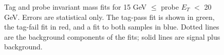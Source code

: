 \documentclass[dissertation.tex]{subfiles}
\begin{document}
\begin{figure}
	\centering
	\hspace{1cm}
	\caption{Tag and probe invariant mass fits for 15 GeV $\leq$ probe $E_{T}$ $<$ 20 GeV.  Errors are statistical only.  The tag-pass fit is shown in green, the tag-fail fit in red, and a fit to both samples in blue.  Dotted lines are the background components of the fits; solid lines are signal plus background.}
	\label{fig:low_ET_bin}
\end{figure}
\end{document}
